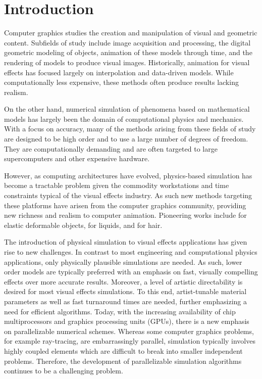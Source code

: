 \chapter{Introduction}
Computer graphics studies the creation and manipulation of visual and
geometric content.  Subfields of study include image acquisition and
processing, the digital geometric modeling of objects, animation of these
models through time, and the rendering of models to produce visual
images.  Historically, animation for visual effects has focused largely on interpolation and
data-driven models.  While computationally less expensive, these
methods often produce results lacking realism.

On the other hand, numerical simulation of phenomena based on mathematical
models has largely been the domain of computational physics and
mechanics.  With a focus on accuracy, many of the methods arising from
these fields of study are designed to be high order and to use a large
number of degrees of freedom. They are computationally demanding and
are often targeted to large supercomputers and other expensive
hardware.
  
However, as computing architectures have evolved, physics-based
simulation has become a tractable problem given the commodity
workstations and time constraints typical of the visual effects
industry.  As such new methods targeting these platforms have arisen from
the computer graphics community, providing new richness and realism to
computer animation.  Pioneering works include
\cite{terzopoulos:1987:elastic} for elastic deformable objects,
\cite{Foster:1996:RAO} for liquids, and \cite{rosenblum:1991:hair} for
hair.  

The introduction of physical simulation to visual effects
applications has given rise to new challenges. In contrast to most
engineering and computational physics applications, only physically
plausible simulations are needed.  As such, lower order models are
typically preferred with an emphasis on fast, visually compelling
effects over more accurate results.  Moreover, a level of artistic
directability is desired for most visual effects simulations. To this
end, artist-tunable material parameters as well as fast turnaround
times are needed, further emphasizing a need for efficient algorithms.
Today, with the increasing availability of chip multiprocessors and
graphics processing units (GPUs), there is a new emphasis on parallelizable
numerical schemes. Whereas some computer graphics problems, for
example ray-tracing, are embarrassingly parallel, simulation typically
involves highly coupled elements which are difficult to break into
smaller independent problems.  Therefore, the development of
parallelizable simulation algorithms continues to be a challenging
problem.

